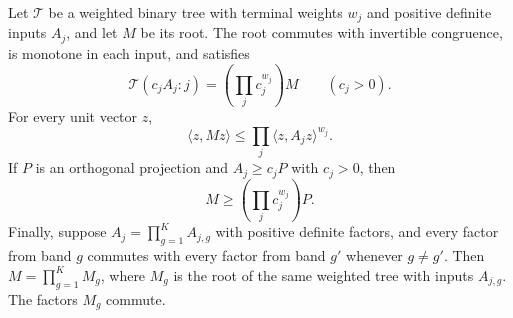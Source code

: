 \begin{lemma}\label{transport:means}
Let $\mathcal T$ be a weighted binary tree with terminal weights $w_j$ and
positive definite inputs $A_j$, and let $M$ be its root.
The root commutes with invertible congruence, is monotone in each input,
and satisfies
\begin{equation}\label{transport:scalar-homogeneity}
 \mathcal T(c_jA_j:j)=\left(\prod_j c_j^{w_j}\right)M
 \qquad(c_j>0).
\end{equation}
For every unit vector $z$,
\begin{equation}\label{transport:vector-jensen}
 \langle z,Mz\rangle\leq\prod_j\langle z,A_jz\rangle^{w_j}.
\end{equation}
If $P$ is an orthogonal projection and $A_j\geq c_jP$ with $c_j>0$, then
\begin{equation}\label{transport:projection-transfer}
 M\geq\left(\prod_jc_j^{w_j}\right)P.
\end{equation}
Finally, suppose $A_j=\prod_{g=1}^K A_{j,g}$ with positive definite
factors, and every factor from band
$g$ commutes with every factor from band $g'$ whenever $g\ne g'$.
Then $M=\prod_{g=1}^K M_g$, where $M_g$ is the root of the same weighted
tree with inputs $A_{j,g}$.  The factors $M_g$ commute.
\end{lemma}

